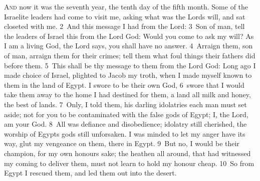 \documentclass[10pt]{book} %
\begin{document}
\lettrine[lines=2]{A}{nd} now it was the seventh year, the tenth day of the fifth month. Some of the Israelite leaders had come to visit me, asking what was the Lord\textquotesingle s will, and sat closeted with me. \textcolor{benred8}{2}~And this message I had from the Lord: \textcolor{benred8}{3}~Son of man, tell the leaders of Israel this from the Lord God: Would you come to ask my will? As I am a living God, the Lord says, you shall have no answer. \textcolor{benred8}{4}~Arraign them, son of man, arraign them for their crimes; tell them what foul things their fathers did before them. \textcolor{benred8}{5}~This shall be thy message to them from the Lord God: Long ago I made choice of Israel, plighted to Jacob my troth, when I made myself known to them in the land of Egypt. I swore to be their own God, \textcolor{benred8}{6}~swore that I would take them away to the home I had destined for them, a land all milk and honey, the best of lands. \textcolor{benred8}{7}~Only, I told them, his darling idolatries each man must set aside; not for you to be contaminated with the false gods of Egypt; I, the Lord, am your God. \textcolor{benred8}{8}~All was defiance and disobedience; idolatry still cherished, the worship of Egypt\textquotesingle s gods still unforsaken. I was minded to let my anger have its way, glut my vengeance on them, there in Egypt. \textcolor{benred8}{9}~But no, I would be their champion, for my own honour\textquotesingle s sake; the heathen all around, that had witnessed my coming to deliver them, must not learn to hold my honour cheap. \textcolor{benred8}{10}~So from Egypt I rescued them, and led them out into the desert.
\end{document}
